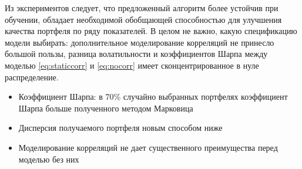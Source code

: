 
Из экспериментов следует, что предложенный алгоритм более устойчив при обучении, обладает необходимой обобщающей способностью для улучшения качества портфеля по ряду показателей. В целом не важно, какую спецификацию модели выбирать: дополнительное моделирование корреляций не принесло большой пользы, разница волатильности и коэффициентов Шарпа между моделью \eqref{eq:staticcorr} и \eqref{eq:nocorr} имеет сконцентрированное в нуле распределение.

\begin{itemize}
	\item Коэффициент Шарпа: в 70\% случайно выбранных портфелях коэффициент Шарпа больше полученного методом Марковица
	\item Дисперсия получаемого портфеля новым способом ниже
	\item Моделирование корреляций не дает существенного преимущества перед моделью без них
\end{itemize}

